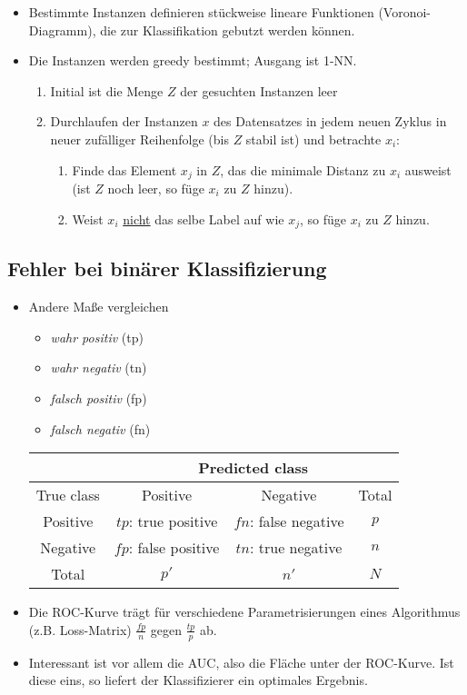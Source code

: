 \documentclass{scrartcl}
\begin{document}
\begin{itemize}
	\item Bestimmte Instanzen definieren stückweise lineare Funktionen 
	(Voronoi-Diagramm), die zur Klassifikation gebutzt werden können.
	\item Die Instanzen werden greedy bestimmt; Ausgang ist 1-NN.
	\begin{enumerate}
		\item Initial ist die Menge $ Z $ der gesuchten Instanzen leer
		\item Durchlaufen der Instanzen $ x $ des Datensatzes in jedem neuen 
		Zyklus in neuer zufälliger Reihenfolge (bis $ Z $ stabil ist) und 
		betrachte $ x_i $:
		\begin{enumerate}
			\item Finde das Element $ x_j $ in $ Z $, das die minimale Distanz 
			zu $ x_i $ ausweist (ist $ Z $ noch leer, so füge $ x_i $ zu $ Z $ 
			hinzu).
			\item Weist $ x_i $ \underline{nicht} das selbe Label auf wie $ x_j 
			$, so füge $ x_i $ zu $ Z $ hinzu.
		\end{enumerate}
	\end{enumerate}
\end{itemize}

\subsection{Fehler bei binärer Klassifizierung}

\begin{itemize}
	\item Andere Maße vergleichen 
	\begin{itemize}
		\item \textit{wahr positiv} (tp)
		\item \textit{wahr negativ} (tn)
		\item \textit{falsch positiv} (fp)
		\item \textit{falsch negativ} (fn)
	\end{itemize}
	\begin{tabular}{|c|c|c|c|}
		\hline 
		& \multicolumn{3}{|c|}{Predicted class}  \\ 
		\hline 
		True class & Positive & Negative & Total \\ 
		\hline 
		Positive & $ tp $: true positive & $ fn $: false negative & $ p $ \\ 
		Negative & $ fp $: false positive & $ tn $: true negative & $ n $ \\ 
		\hline 
		Total & $ p' $ & $ n' $ & $ N $ \\ 
		\hline 
	\end{tabular} 
	\item Die ROC-Kurve trägt für verschiedene Parametrisierungen eines 
	Algorithmus (z.B. Loss-Matrix) $ \frac{fp}{n} $ gegen $ \frac{tp}{p} $ ab.
	\item Interessant ist vor allem die AUC, also die Fläche unter der 
	ROC-Kurve. Ist diese eins, so liefert der Klassifizierer ein optimales 
	Ergebnis.
\end{itemize}
\end{document}
